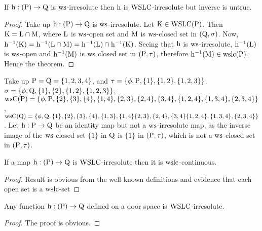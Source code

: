\begin{thm}\label{thm6.4.3}
If $\mathrm{h}: (\mathrm{P}) \to \mathrm{Q}$ is $\mathrm{ws}$-irresolute then $\mathrm{h}$ is $\mathrm{WSLC}$-irresolute but inverse is untrue.
\end{thm}

\begin{proof}
Take up $\mathrm{h} : (\mathrm{P}) \to \mathrm{Q}$ is $\mathrm{ws}$-irresolute. Let $\mathrm{K} \in \mathrm{WSLC}(\mathrm{P})$. Then $\mathrm{K} = \mathrm{L} \cap \mathrm{M}$, where $\mathrm{L}$ is $\mathrm{ws}$-open set and $\mathrm{M}$ is $\mathrm{ws}$-closed set in $(\mathrm{Q}, \sigma)$. Now, $\mathrm{h}^{-1} (\mathrm{K}) = \mathrm{h}^{-1} (\mathrm{L} \cap \mathrm{M}) = \mathrm{h}^{-1} (\mathrm{L}) \cap \mathrm{h}^{-1} (\mathrm{K})$. Seeing that $\mathrm{h}$ is $\mathrm{ws}$-irresolute, $\mathrm{h}^{-1}(\mathrm{L})$ is $\mathrm{ws}$-open and $\mathrm{h}^{-1}(\mathrm{M})$ is $\mathrm{ws}$ closed set in $(\mathrm{P}, \tau)$, therefore $\mathrm{h}^{-1}(\mathrm{M})\in \mathrm{ws}\mathrm{lc}(\mathrm{P})$, Hence the theorem.
\end{proof}

\begin{exm}\label{exam6.4.4}
Take up $\mathrm{P} = \mathrm{Q} = \{1, 2, 3, 4\}$, and $\tau= \{\phi, \mathrm{P}, \{1\}, \{1, 2\}, \{1, 2, 3\}\}$. $\sigma = \{\phi, \mathrm{Q}, \{1\}, \{2\}, \{1, 2\}, \{1, 2, 3\}\}$, $\ws\TSC(\TSP) = \{\phi, \TSP, \{2\}, \{3\}, \{4\}, \{1, 4\}, \{2,3\},\break \{2,4\},\{3,4\}, \{1,2, 4\},\{1,3,4\},\{2,3,4\}\}$, $\ws\TSC(\TSQ) = \{\phi, \TSQ,\{1\}, \{2\}, \{3\}, \{4\}, \{1, 3\},\break \{1, 4\} \{2,3\}, \{2,4\}, \{3,4\}\{1,2, 4\},\{1,3,4\},\{2,3,4\}\}$. Let $\mathrm{h} : \mathrm{P} \to \mathrm{Q}$ be an identity map but not a $\mathrm{ws}$-irresolute map, as the inverse image of the $\mathrm{ws}$-closed set $\{1\}$ in $\mathrm{Q}$ is $\{1\}$ in $(\mathrm{P}, \tau)$, which is not a $\mathrm{ws}$-closed set in $(\mathrm{P}, \tau)$.
\end{exm}

\begin{thm}\label{thm6.4.5}
If a map $\mathrm{h}: (\mathrm{P}) \to \mathrm{Q}$ is $\mathrm{WSLC}$-irresolute then it is $\mathrm{ws}\mathrm{lc}$-continuous.
\end{thm}

\begin{proof}
Result is obvious from the well known definitions and evidence that each open set is a $\mathrm{ws}\mathrm{lc}$-set
\end{proof}

\begin{thm}\label{thm6.4.6}
Any function $\mathrm{h} : (\mathrm{P}) \to \mathrm{Q}$ defined on a door space is $\mathrm{WSLC}$-irresolute.
\end{thm}

\begin{proof}
The proof is obvious.
\end{proof}

